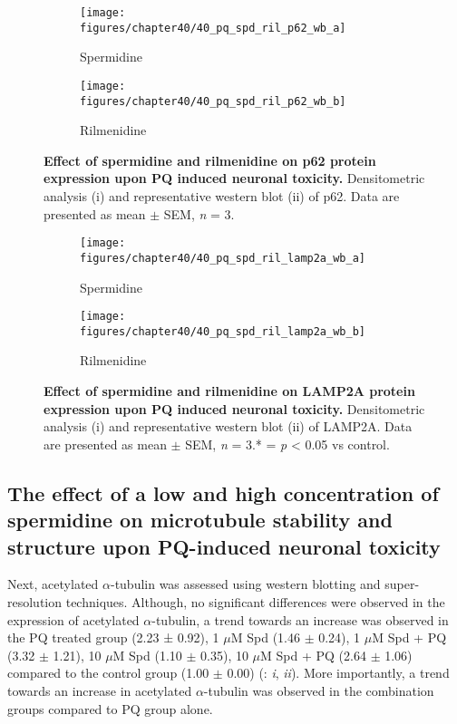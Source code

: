 \begin{figure}[!htbp]
  \center
  \begin{subfigure}[b]{0.495\linewidth}
    \texttt{[image: figures/chapter40/40\_pq\_spd\_ril\_p62\_wb\_a]}
    \caption{Spermidine}
  \end{subfigure}
  \begin{subfigure}[b]{0.495\linewidth}
    \texttt{[image: figures/chapter40/40\_pq\_spd\_ril\_p62\_wb\_b]}
    \caption{Rilmenidine}
  \end{subfigure}
  \caption[Effect of spermidine and rilmenidine on p62 protein expression upon PQ induced neuronal toxicity]{\textbf{Effect of spermidine and rilmenidine on p62 protein expression upon PQ induced neuronal toxicity.} Densitometric analysis (i) and representative western blot  (ii) of p62. Data are presented as mean $\pm$ SEM, \textit{n} = 3.}
  \label{fig:40_pq_spd_ril_p62_wb_a}
\end{figure}
  
\begin{figure}[!htbp]
  \center
  \begin{subfigure}[b]{0.495\linewidth}
    \texttt{[image: figures/chapter40/40\_pq\_spd\_ril\_lamp2a\_wb\_a]}
    \caption{Spermidine}
  \end{subfigure}
  \begin{subfigure}[b]{0.495\linewidth}
    \texttt{[image: figures/chapter40/40\_pq\_spd\_ril\_lamp2a\_wb\_b]}
    \caption{Rilmenidine}
  \end{subfigure}
  \caption[Effect of spermidine and rilmenidine on LAMP2A protein expression upon PQ induced neuronal toxicity]{\textbf{Effect of spermidine and rilmenidine on LAMP2A protein expression upon PQ induced neuronal toxicity.} Densitometric analysis (i) and representative western blot  (ii) of LAMP2A. Data are presented as mean $\pm$ SEM, \textit{n} = 3.* = \textit{p} < 0.05 vs control.}
  \label{fig:40_pq_spd_ril_lamp2a_wb_a}
\end{figure}


\subsection{The effect of a low and high concentration of spermidine on microtubule stability and structure upon PQ-induced neuronal toxicity}
Next, acetylated $\alpha$-tubulin was assessed using western blotting and super-resolution techniques. Although, no significant differences were observed in the expression of acetylated $\alpha$-tubulin, a trend towards an increase was observed in the PQ treated group (2.23 ± 0.92), 1 $\mu$M Spd (1.46 $\pm$ 0.24), 1 $\mu$M Spd + PQ (3.32 $\pm$ 1.21), 10 $\mu$M Spd (1.10 $\pm$ 0.35), 10 $\mu$M Spd + PQ (2.64 $\pm$ 1.06) compared to the control group (1.00 $\pm$ 0.00) (: \textit{i}, \textit{ii}). More importantly, a trend towards an increase in acetylated $\alpha$-tubulin was observed in the combination groups compared to PQ group alone. 

